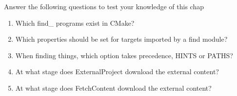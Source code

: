 Answer the following questions to test your knowledge of this chap

\begin{enumerate}
\item 
Which find\_ programs exist in CMake?

\item 
Which properties should be set for targets imported by a find module?

\item 
When finding things, which option takes precedence, HINTS or PATHS?

\item 
At what stage does ExternalProject download the external content?

\item 
At what stage does FetchContent download the external content?
\end{enumerate}